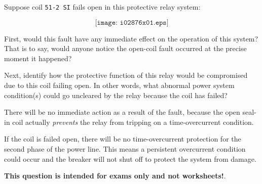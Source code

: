 

Suppose coil {\tt 51-2 SI} fails open in this protective relay system:

$$\texttt{[image: i02876x01.eps]}$$

First, would this fault have any immediate effect on the operation of this system?  That is to say, would anyone notice the open-coil fault occurred at the precise moment it happened?

\vskip 10pt

Next, identify how the protective function of this relay would be compromised due to this coil failing open.  In other words, what abnormal power system condition(s) could go uncleared by the relay because the coil has failed?

\vskip 10pt







There will be no immediate action as a result of the fault, because the open seal-in coil actually {\it prevents} the relay from tripping on a time-overcurrent condition.

\vskip 10pt

If the coil is failed open, there will be no time-overcurrent protection for the second phase of the power line.  This means a persistent overcurrent condition could occur and the breaker will not shut off to protect the system from damage.







{\bf This question is intended for exams only and not worksheets!}.



